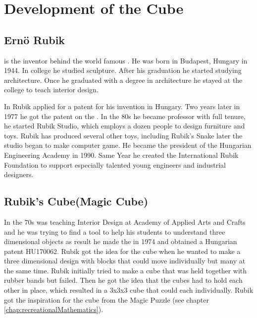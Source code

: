 \chapter{Development of the Cube}
\section{Ern\"{o} Rubik}
\erno{} is the inventor behind the world famous \rubik{}. He was born in Budapest, Hungary in 1944.  In college he studied sculpture. After his graduation he started studying architecture.  Once he graduated with a degree in architecture he stayed at the college to teach interior design. 

In  Rubik applied for a patent for his invention in Hungary. Two years later in 1977 he got the patent on the \mcube{}.
In the 80s he became professor with full tenure, he started Rubik Studio, which employs a dozen people to design furniture and toys. Rubik has produced several other toys, including Rubik's Snake later the studio began to make computer game. He became the president of the Hungarian Engineering Academy in 1990. Same Year he created the International Rubik Foundation to support especially talented young engineers and industrial designers.
 
\section{Rubik's Cube(Magic Cube)}
In the 70s \erno{} was teaching Interior Design at Academy of Applied Arts and Crafts and he was trying to find a tool to help his students to understand three dimensional objects as result he made the \mcube in 1974 and obtained a Hungarian patent HU170062. 
Rubik got the idea for the cube when he wanted to make a three dimensional design with blocks that could move individually but many at the same time. Rubik initially tried  to make a cube that was held together with rubber bands but failed. Then he got the idea that the cubes had to hold each other in place, which resulted in a 3x3x3 cube that could \twist{} each \face{} individually. Rubik got the inspiration for the cube from the Magic Puzzle (see chapter \ref{chap:recreationalMathematics}).

